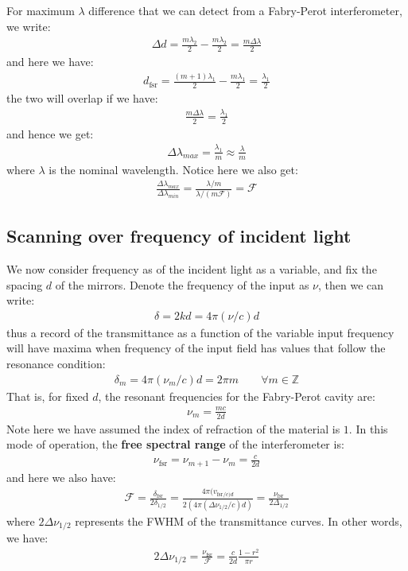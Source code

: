 \documentclass[11pt]{book}
\theoremstyle{break}
\theoremstyle{break}
\newcommand{\Z}{\mathbb{Z}}
\begin{document}
For maximum $\lambda$ difference that we can detect from a Fabry-Perot interferometer, we write:
\begin{align*}
\Delta d = \frac{m\lambda_2}{2} - \frac{m\lambda_2}{2} = \frac{m\Delta \lambda}{2}
\end{align*}
and here we have:
\begin{align*}
d_{\text{fsr}} = \frac{(m+1)\lambda_1}{2} - \frac{m\lambda_1}{2} = \frac{\lambda_1}{2}
\end{align*}
the two will overlap if we have:
\begin{align*}
\frac{m\Delta\lambda}{2} = \frac{\lambda_1}{2}
\end{align*}
and hence we get:
\begin{align*}
\Delta \lambda_{max} = \frac{\lambda_1}{m}\approx \frac{\lambda}{m}
\end{align*}
where $\lambda$ is the nominal wavelength. Notice here we also get:
\begin{align*}
\frac{\Delta \lambda_{max}}{\Delta \lambda_{min}} = \frac{\lambda / m}{\lambda / (m\mathcal{F})} = \mathcal{F}
\end{align*}

\subsection{Scanning over frequency of incident light}
We now consider frequency as of the incident light as a variable, and fix the spacing $d$ of the mirrors. Denote the frequency of the input as $\nu$, then we can write:
\begin{align*}
\delta = 2kd = 4\pi (\nu/c)d
\end{align*}
thus a record of the transmittance as a function of the variable input frequency will have maxima when frequency of the input field has values that follow the resonance condition:
\begin{align*}
\delta_m = 4\pi (\nu_m/c)d = 2\pi m \qquad \forall m\in \Z
\end{align*}
That is, for fixed $d$, the resonant frequencies for the Fabry-Perot cavity are:
\begin{align*}
\nu_m = \frac{mc}{2d}
\end{align*}
Note here we have assumed the index of refraction of the material is $1$. In this mode of operation, the \textbf{free spectral range} of the interferometer is:
\begin{align*}
\nu_{\text{fsr}} = \nu_{m+1} - \nu_m = \frac{c}{2d}
\end{align*}
and here we also have:
\begin{align*}
\mathcal{F} = \frac{\delta_{\text{fsr}}}{2\delta_{1/2}} = \frac{4\pi (v_{\text{fsr}/c) d}}{2(4\pi (\Delta \nu_{1/2}/c)d)} = \frac{\nu_{\text{fsr}}}{2\Delta_{1/2}}
\end{align*}
where $2\Delta\nu_{1/2}$ represents the FWHM of the transmittance curves. In other words, we have:
\begin{align*}
2\Delta\nu_{1/2} = \frac{\nu_{\text{fsr}}}{\mathcal{F}} = \frac{c}{2d} \frac{1-r^2}{\pi r}
\end{align*}
\end{document}
